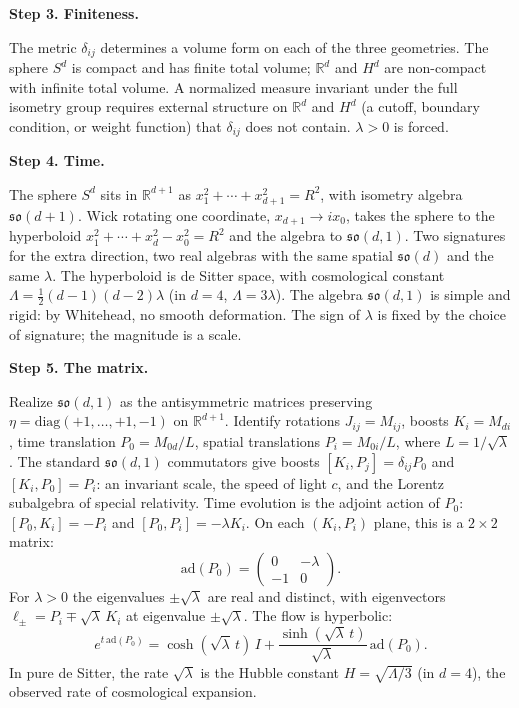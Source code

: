 \documentclass[11pt]{article}
\begin{document}
\textbf{Step 3.\; Finiteness.}

The metric $\delta_{ij}$ determines a volume form on each of the three geometries. The sphere $S^d$ is compact and has finite total volume; $\mathbb{R}^d$ and $H^d$ are non-compact with infinite total volume. A normalized measure invariant under the full isometry group requires external structure on $\mathbb{R}^d$ and $H^d$ (a cutoff, boundary condition, or weight function) that $\delta_{ij}$ does not contain. $\lambda > 0$ is forced.

\textbf{Step 4.\; Time.}

The sphere $S^d$ sits in $\mathbb{R}^{d+1}$ as $x_1^2 + \cdots + x_{d+1}^2 = R^2$, with isometry algebra $\mathfrak{so}(d{+}1)$. Wick rotating one coordinate, $x_{d+1} \to ix_0$, takes the sphere to the hyperboloid $x_1^2 + \cdots + x_d^2 - x_0^2 = R^2$ and the algebra to $\mathfrak{so}(d,1)$. Two signatures for the extra direction, two real algebras with the same spatial $\mathfrak{so}(d)$ and the same $\lambda$. The hyperboloid is de Sitter space, with cosmological constant $\Lambda = \tfrac{1}{2}(d-1)(d-2)\lambda$ (in $d=4$, $\Lambda = 3\lambda$). The algebra $\mathfrak{so}(d,1)$ is simple and rigid: by Whitehead, no smooth deformation. The sign of $\lambda$ is fixed by the choice of signature; the magnitude is a scale.

\textbf{Step 5.\; The matrix.}

Realize $\mathfrak{so}(d,1)$ as the antisymmetric matrices preserving $\eta = \mathrm{diag}(+1,\ldots,+1,-1)$ on $\mathbb{R}^{d+1}$. Identify rotations $J_{ij} = M_{ij}$, boosts $K_i = M_{di}$, time translation $P_0 = M_{0d}/L$, spatial translations $P_i = M_{0i}/L$, where $L = 1/\sqrt{\lambda}$. The standard $\mathfrak{so}(d,1)$ commutators give boosts $[K_i, P_j] = \delta_{ij} P_0$ and $[K_i, P_0] = P_i$: an invariant scale, the speed of light $c$, and the Lorentz subalgebra of special relativity. Time evolution is the adjoint action of $P_0$: $[P_0, K_i] = -P_i$ and $[P_0, P_i] = -\lambda K_i$. On each $(K_i, P_i)$ plane, this is a $2 \times 2$ matrix:
\[
\mathrm{ad}(P_0) = \begin{pmatrix} 0 & -\lambda \\ -1 & 0 \end{pmatrix}.
\]
For $\lambda > 0$ the eigenvalues $\pm\sqrt{\lambda}$ are real and distinct, with eigenvectors $\ell_\pm = P_i \mp \sqrt{\lambda}\,K_i$ at eigenvalue $\pm\sqrt{\lambda}$. The flow is hyperbolic:
\[
e^{t\,\mathrm{ad}(P_0)} = \cosh(\sqrt{\lambda}\,t)\,I + \frac{\sinh(\sqrt{\lambda}\,t)}{\sqrt{\lambda}}\,\mathrm{ad}(P_0).
\]
In pure de Sitter, the rate $\sqrt{\lambda}$ is the Hubble constant $H = \sqrt{\Lambda/3}$ (in $d=4$), the observed rate of cosmological expansion.
\end{document}
